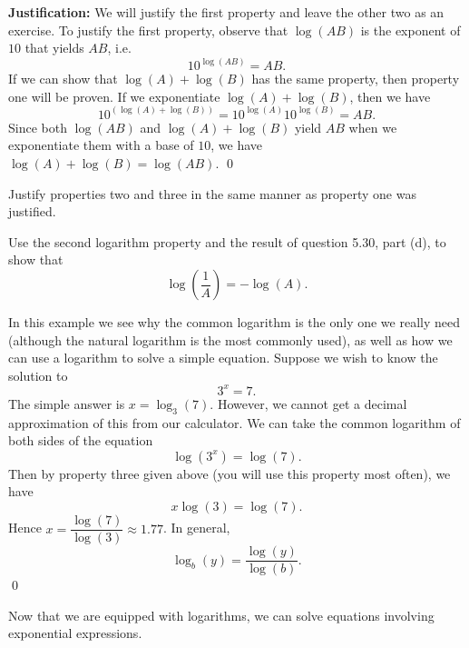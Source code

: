 \begin{eg}
{\bf Justification:} We will justify the first property and leave the other two as an exercise. To justify the first property, observe that $\log(AB)$ is the exponent of $10$ that yields $AB$, i.e.
\[
10^{\log(AB)} = AB.
\]
If we can show that $\log(A)+\log(B)$ has the same property, then property one will be proven. If we exponentiate $\log(A) + \log(B)$, then we have
\[
10^{(\log(A)+\log(B))} = 10^{\log(A)}10^{\log(B)} = AB.
\]
Since both $\log(AB)$ and $\log(A)+\log(B)$ yield $AB$ when we exponentiate them with a base of $10$, we have $\log(A)+\log(B) = \log(AB)$. \qed \end{eg}

\par

\begin{question} Justify properties two and three in the same manner as property one was justified.
\end{question}

\par

\begin{question} Use the second logarithm property and the result of question 5.30, part (d), to show that
\[
\log\left(\frac{1}{A}\right) = -\log(A).
\] 
\end{question}

\par

\begin{eg} In this example we see why the common logarithm is the only one we really need (although the natural logarithm is the most commonly used), as well as how we can use a logarithm to solve a simple equation. Suppose we wish to know the solution to 
\[
3^{x}  = 7.
\]
The simple answer is $x = \log_{3}(7)$. However, we cannot get a decimal approximation of this from our calculator. We can take the common logarithm of both sides of the equation
\[
\log(3^{x}) = \log(7).
\]
Then by property three given above (you will use this property most often), we have
\[
x\log(3) = \log(7).
\]
Hence $x = \dfrac{\log(7)}{\log(3)}\approx 1.77$. In general,
\[
\log_{b}(y) = \frac{\log(y)}{\log(b)}.
\]\qed \end{eg}

Now that we are equipped with logarithms, we can solve equations involving exponential expressions.

\par

